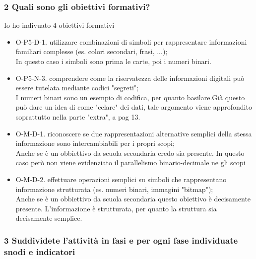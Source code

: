 \documentclass[a4paper]{article}
\begin{document}
\subsubsection{2 Quali sono gli obiettivi formativi?}
Io ho indivuato 4 obiettivi formativi
\begin{itemize}
	\item O-P5-D-1. utilizzare combinazioni di simboli per rappresentare informazioni familiari complesse (es. colori secondari, frasi, ...);\\
		In questo caso i simboli sono prima le carte, poi i numeri binari.
	\item O-P5-N-3. comprendere come la riservatezza delle informazioni digitali può essere tutelata mediante codici "segreti";\\
		I numeri binari sono un esempio di codifica, per quanto basilare.Già questo può dare un idea di come "celare" dei dati, tale argomento viene approfondito soprattutto nella parte "extra", a pag 13.  
	\item O-M-D-1. riconoscere se due rappresentazioni alternative semplici della stessa informazione sono intercambiabili per i propri scopi;\\
		Anche se è un obbiettivo da scuola secondaria credo sia presente. In questo caso però non viene evidenziato il parallelismo binario-decimale ne gli scopi
	\item O-M-D-2. effettuare operazioni semplici su simboli che rappresentano informazione strutturata (es. numeri binari, immagini "bitmap");\\ 
		Anche se è un obbiettivo da scuola secondaria questo obiettivo è decisamente presente. L'informazione è strutturata, per quanto la struttura sia decisamente semplice.
\end{itemize}
\subsubsection{3 Suddividete l’attività in fasi e per ogni fase individuate snodi  e indicatori}
\end{document}
